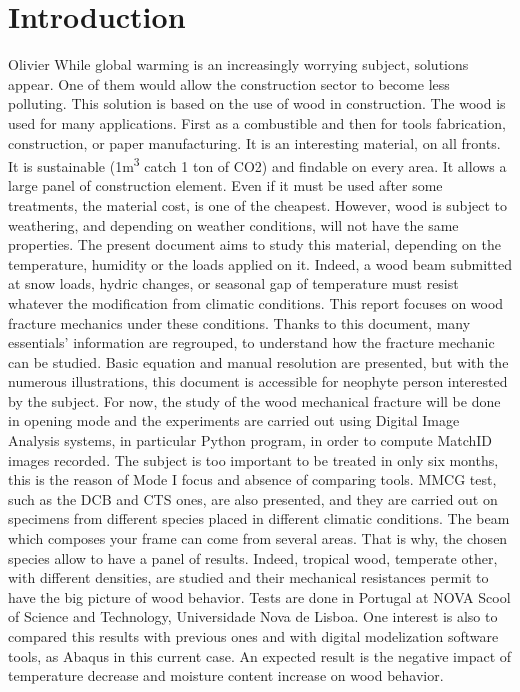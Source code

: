 
\chapter{Introduction} %

\label{Introduction} %


Olivier  While global warming is an increasingly worrying subject, solutions appear. One of them would allow the construction sector to become less polluting. This solution is based on the use of wood in construction. The wood is used for many applications. First as a combustible and then for tools fabrication, construction, or paper manufacturing. It is an interesting material, on all fronts. It is sustainable (1\si{\cubic\meter} catch 1 ton of CO2) and findable on every area. It allows a large panel of construction element. Even if it must be used after some treatments, the material cost, is one of the cheapest. However, wood is subject to weathering, and depending on weather conditions, will not have the same properties. The present document aims to study this material, depending on the temperature, humidity or the loads applied on it. Indeed, a wood beam submitted at snow loads, hydric changes, or seasonal gap of temperature must resist whatever the modification from climatic conditions. This report focuses on wood fracture mechanics under these conditions.
\newline 
Thanks to this document, many essentials' information are regrouped, to understand how the fracture mechanic can be studied. Basic equation and manual resolution are presented, but with the numerous illustrations, this document is accessible for neophyte person interested by the subject.
For now, the study of the wood mechanical fracture will be done in opening mode and the experiments are carried out using Digital Image Analysis systems, in particular Python program, in order to compute MatchID images recorded. The subject is too important to be treated in only six months, this is the reason of Mode I focus and absence of comparing tools. 
\newline
MMCG test, such as the DCB and CTS ones, are also presented, and they are carried out on specimens from different species placed in different climatic conditions. The beam which composes your frame can come from several areas. That is why, the chosen species allow to have a panel of results. Indeed, tropical wood, temperate other, with different densities, are studied and their mechanical resistances permit to have the big picture of wood behavior. 
\newline
Tests are done in Portugal at NOVA Scool of Science and Technology, Universidade Nova de Lisboa. One interest is also to compared this results with previous ones and with digital modelization software tools, as Abaqus in this current case. An expected result is the negative impact of temperature decrease and moisture content increase on wood behavior.
